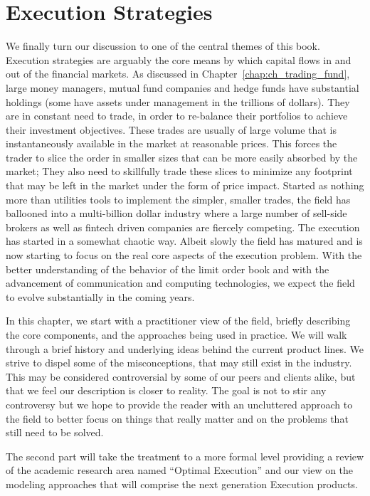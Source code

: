 \chapter{Execution Strategies\label{chap:ch_exec_models}}

We finally turn our discussion to one of the central themes of this book. Execution strategies are arguably the core means by which capital flows in and out of the financial markets.  As discussed in Chapter~\ref{chap:ch_trading_fund}, large money managers, mutual fund companies and hedge funds have substantial holdings (some have assets under management in the trillions of dollars). They are in constant need to trade, in order to re-balance their portfolios to achieve their investment objectives. These trades are usually of large volume that is instantaneously available in the market at reasonable prices. This forces the trader to slice the order in smaller sizes that can be more easily absorbed by the market; They also need to skillfully trade these slices to minimize any footprint that may be left in the market under the form of price impact. Started as nothing more than utilities tools to implement the simpler, smaller trades, the field has ballooned into a multi-billion dollar industry where a large number of sell-side brokers as well as fintech driven companies are fiercely competing. The execution has started in a somewhat chaotic way. Albeit slowly the field has matured and is now starting to focus on the real core aspects of the execution problem. With the better understanding of the behavior of the limit order book and with the advancement of communication and computing technologies, we expect the field to evolve substantially in the coming years.


In this chapter, we start with a practitioner view of the field, briefly describing the core components, and the approaches being used in practice. We will walk through a brief history and underlying ideas behind the current product lines. We strive to dispel some of the misconceptions, that may still exist in the industry. This may be considered controversial by some of our peers and clients alike, but that we feel our description is closer to reality. The goal is not to stir any controversy but we hope to provide the reader with an uncluttered approach to the field to better focus on things that really matter and on the problems that still need to be solved.


The second part will take the treatment to a more formal level providing a review of the academic research area named ``Optimal Execution'' and our view on the modeling approaches that will comprise the next generation Execution products.



